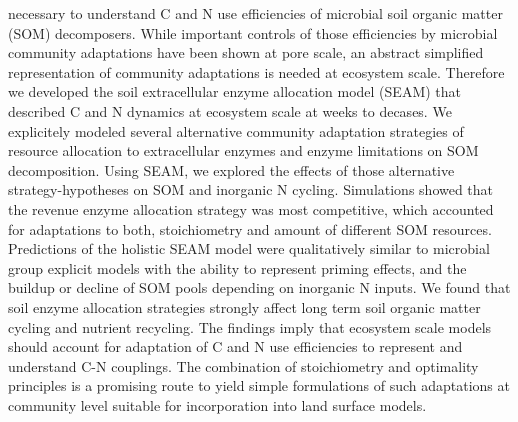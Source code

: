 necessary to understand C and N use efficiencies of microbial soil organic
matter (SOM) decomposers. While important controls of those efficiencies by
microbial community adaptations have been shown at pore scale, an abstract
simplified representation of community adaptations is needed at ecosystem scale.
Therefore we developed the soil extracellular enzyme allocation model (SEAM)
that described C and N dynamics at ecosystem scale at weeks to decases. We
explicitely modeled several alternative community adaptation strategies of
resource allocation to extracellular enzymes and enzyme limitations on SOM
decomposition. Using SEAM, we explored the effects of those alternative
strategy-hypotheses on SOM and inorganic N cycling.
Simulations showed that the revenue enzyme allocation strategy was most
competitive, which accounted for adaptations to both, stoichiometry and amount
of different SOM resources.
Predictions of the holistic SEAM model were qualitatively similar to microbial
group explicit models with the ability to represent priming effects, and the
buildup or decline of SOM pools depending on inorganic N inputs.
We found that soil enzyme allocation strategies strongly affect long term soil
organic matter cycling and nutrient recycling.
The findings imply that ecosystem scale models should account for adaptation of
C and N use efficiencies to represent and understand C-N couplings. The
combination of stoichiometry and optimality principles is a promising route to
yield simple formulations of such adaptations at community level suitable for
incorporation into land surface models.

